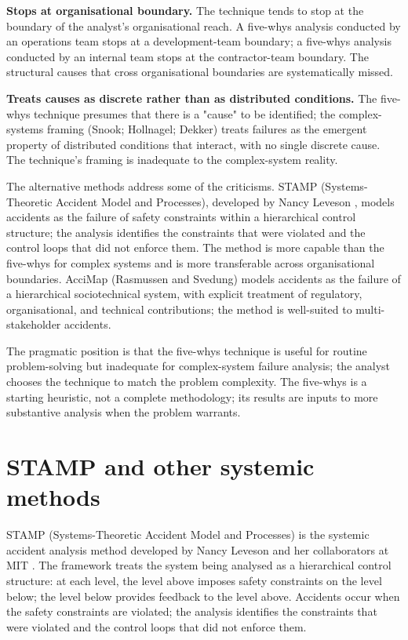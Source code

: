 \textbf{Stops at organisational boundary.} The technique tends to stop at the boundary of the analyst's organisational reach. A five-whys analysis conducted by an operations team stops at a development-team boundary; a five-whys analysis conducted by an internal team stops at the contractor-team boundary. The structural causes that cross organisational boundaries are systematically missed.

\textbf{Treats causes as discrete rather than as distributed conditions.} The five-whys technique presumes that there is a "cause" to be identified; the complex-systems framing (Snook; Hollnagel; Dekker) treats failures as the emergent property of distributed conditions that interact, with no single discrete cause. The technique's framing is inadequate to the complex-system reality.

The alternative methods address some of the criticisms. STAMP (Systems-Theoretic Accident Model and Processes), developed by Nancy Leveson \cite{text:leveson2011}, models accidents as the failure of safety constraints within a hierarchical control structure; the analysis identifies the constraints that were violated and the control loops that did not enforce them. The method is more capable than the five-whys for complex systems and is more transferable across organisational boundaries. AcciMap (Rasmussen and Svedung) models accidents as the failure of a hierarchical sociotechnical system, with explicit treatment of regulatory, organisational, and technical contributions; the method is well-suited to multi-stakeholder accidents.

The pragmatic position is that the five-whys technique is useful for routine problem-solving but inadequate for complex-system failure analysis; the analyst chooses the technique to match the problem complexity. The five-whys is a starting heuristic, not a complete methodology; its results are inputs to more substantive analysis when the problem warrants.

\section{STAMP and other systemic methods}

STAMP (Systems-Theoretic Accident Model and Processes) is the systemic accident analysis method developed by Nancy Leveson and her collaborators at MIT \cite{text:leveson2011}. The framework treats the system being analysed as a hierarchical control structure: at each level, the level above imposes safety constraints on the level below; the level below provides feedback to the level above. Accidents occur when the safety constraints are violated; the analysis identifies the constraints that were violated and the control loops that did not enforce them.

